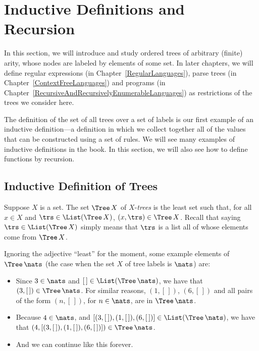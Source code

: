 \section{Inductive Definitions and Recursion}
\label{TreesAndInductiveDefinitions}

In this section, we will introduce and study ordered trees of
arbitrary (finite) arity, whose nodes are labeled by elements of some
set.  In later chapters, we will define regular expressions (in
Chapter~\ref{RegularLanguages}), parse trees (in
Chapter~\ref{ContextFreeLanguages}) and programs (in
Chapter~\ref{RecursiveAndRecursivelyEnumerableLanguages}) as
restrictions of the trees we consider here.

The definition of the set of all trees over a set of labels is our
first example of an inductive definition---a definition in which we
collect together all of the values that can be constructed using a set
of rules.  We will see many examples of inductive definitions in the
book.  In this section, we will also see how to define functions by
recursion.

\subsection{Inductive Definition of Trees}

%

Suppose $X$ is a set.  The set $\Tree\,X$ of $X$-\emph{trees} is the
least set such that, for all $x\in X$ and $\trs\in\List(\Tree\,X)$,
$(x,\trs)\in\Tree\,X$.  Recall that saying $\trs\in\List(\Tree\,X)$
simply means that $\trs$ is a list all of whose elements come
from $\Tree\,X$.

Ignoring the adjective ``least'' for the moment, some example elements
of $\Tree\,\nats$ (the case when the set $X$ of tree labels is $\nats$)
are:
\begin{itemize}
\item Since $3\in \nats$ and $[\,]\in\List(\Tree\,\nats)$, we have
  that $(3,[\,])\in\Tree\,\nats$.  For similar reasons, $(1,[\,])$,
  $(6,[\,])$ and all pairs of the form $(n,[\,])$, for $n\in\nats$,
  are in $\Tree\,\nats$.  

\item Because $4\in \nats$, and $[(3,[\,]), (1,[\,]),
  (6,[\,])]\in\List(\Tree\,\nats)$, we have that $(4,[(3,[\,]),
  (1,[\,]), (6,[\,])])\in\Tree\,\nats$.

\item And we can continue like this forever.
\end{itemize}

